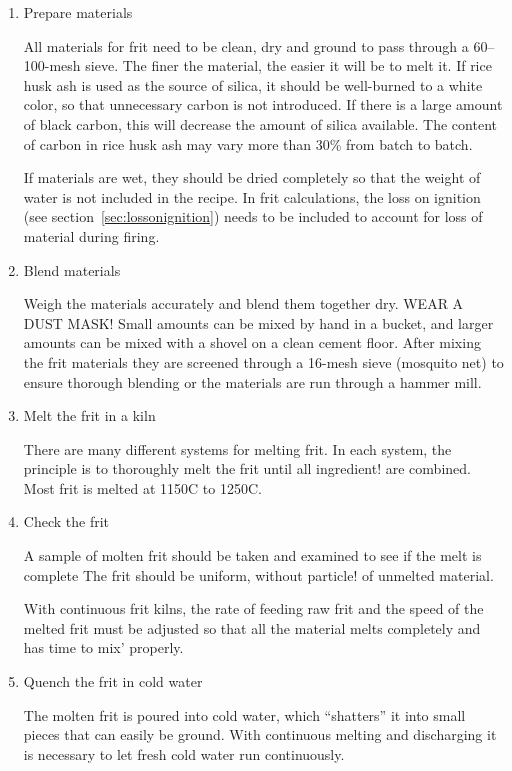 \begin{enumerate}
\item Prepare materials

All materials for frit need to be clean, dry and ground to pass through a 
60--100-mesh sieve. The finer the material, the easier it will be to melt it. 
If rice husk ash is used as the source of silica, it should be well-burned to a 
white color, so that unnecessary carbon is not introduced. If there is a large 
amount of black carbon, this will decrease the amount of silica available. The 
content of carbon in rice husk ash may vary more than 30\% from batch to batch.

If materials are wet, they should be dried completely so that the weight of 
water is not included in the recipe. In frit calculations, the loss on ignition 
(see section~\ref{sec:lossonignition}) needs to be included to account for loss 
of material during firing.

\item Blend materials

Weigh the materials accurately and blend them together dry. WEAR A DUST MASK! 
Small amounts can be mixed by hand in a bucket, and larger amounts can be mixed 
with a shovel on a clean cement floor. After mixing the frit materials they are 
screened through a 16-mesh sieve (mosquito net) to ensure thorough blending or 
the materials are run through a hammer mill.

\item Melt the frit in a kiln

There are many different systems for melting frit. In each system, the 
principle is to thoroughly melt the frit until all ingredient! are combined. 
Most frit is melted at 1150\degree C to 1250\degree C.

\item Check the frit

A sample of molten frit should be taken and examined to see if the melt is 
complete The frit should be uniform, without particle! of unmelted material.

With continuous frit kilns, the rate of feeding raw frit and the speed of the 
melted frit must be adjusted so that all the material melts completely and has 
time to mix' properly.

\item Quench the frit in cold water

The molten frit is poured into cold water, which ``shatters'' it into small 
pieces that can easily be ground. With continuous melting and discharging it is 
necessary to let fresh cold water run continuously.


\end{enumerate}
